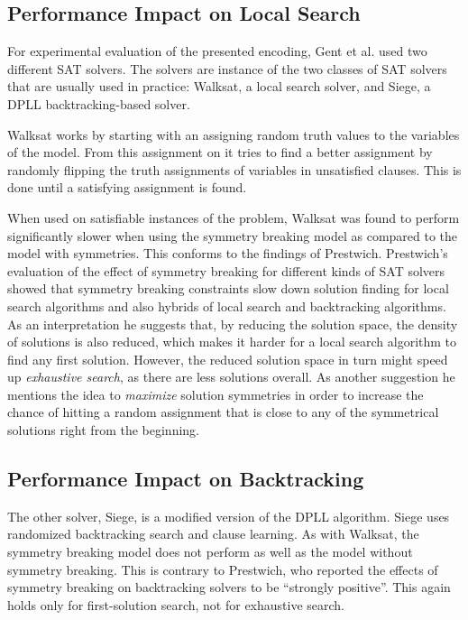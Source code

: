\documentclass[a4paper]{scrartcl}
\begin{document}
\subsection{Performance Impact on Local Search}

For experimental evaluation of the presented encoding, Gent et al. used two different SAT solvers. The solvers are instance of the two classes of SAT solvers that are usually used in practice: Walksat\cite{walksat2004}, a local search solver, and Siege\cite{Ryan04}, a DPLL backtracking-based solver.

Walksat works by starting with an assigning random truth values to the variables of the model. From this assignment on it tries to find a better assignment by randomly flipping the truth assignments of variables in unsatisfied clauses. This is done until a satisfying assignment is found.

When used on satisfiable instances of the problem, Walksat was found to perform significantly slower when using the symmetry breaking model as compared to the model with symmetries. This conforms to the findings of Prestwich\cite{Prestwich}. Prestwich's evaluation of the effect of symmetry breaking for different kinds of SAT solvers showed that symmetry breaking constraints slow down solution finding for local search algorithms and also hybrids of local search and backtracking algorithms. As an interpretation he suggests that, by reducing the solution space, the density of solutions is also reduced, which makes it harder for a local search algorithm to find any first solution. However, the reduced solution space in turn might speed up \emph{exhaustive search}, as there are less solutions overall. As another suggestion he mentions the idea to \emph{maximize} solution symmetries in order to increase the chance of hitting a random assignment that is close to any of the symmetrical solutions right from the beginning.


\subsection{Performance Impact on Backtracking}

The other solver, Siege, is a modified version of the DPLL algorithm\cite{DPLL}. Siege uses randomized backtracking search and clause learning. As with Walksat, the symmetry breaking model does not perform as well as the model without symmetry breaking. This is contrary to Prestwich, who reported the effects of symmetry breaking on backtracking solvers to be ``strongly positive''\cite{Prestwich}. This again holds only for first-solution search, not for exhaustive search.
\end{document}
